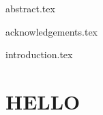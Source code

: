 \documentclass{bris}
\begin{document}

\maketitle

\frontmatter

\makedecl

{abstract.tex}

{acknowledgements.tex}

\tableofcontents*
{}
\clearpage

\listoffigures
\clearpage

\listoftables
\clearpage

\mainmatter

{introduction.tex}

\clearpage

\section{HELLO}
\end{document}
